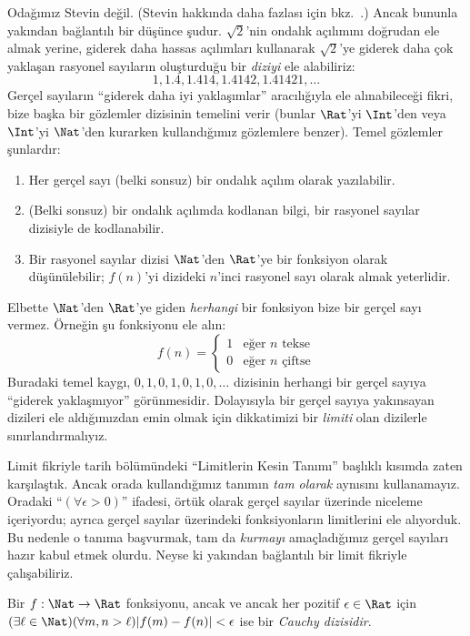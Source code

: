 Odağımız Stevin değil. (Stevin hakkında daha fazlası için
bkz.\ \citealt{KatzKatz2012}.) Ancak bununla yakından bağlantılı bir düşünce
şudur. $\sqrt{2}$'nin ondalık açılımını doğrudan ele almak yerine, giderek
daha hassas açılımları kullanarak $\sqrt{2}$'ye giderek daha çok yaklaşan
rasyonel sayıların oluşturduğu bir \emph{diziyi} ele alabiliriz:
\[
1, 1.4, 1.414, 1.4142, 1.41421,\ldots
\]
Gerçel sayıların “giderek daha iyi yaklaşımlar” aracılığıyla ele alınabileceği
fikri, bize başka bir gözlemler dizisinin temelini verir (bunlar $\Rat$'yi
$\Int$'den veya $\Int$'yi $\Nat$'den kurarken kullandığımız gözlemlere
benzer). Temel gözlemler şunlardır:
\begin{enumerate}
	\item Her gerçel sayı (belki sonsuz) bir ondalık açılım olarak yazılabilir.
	\item (Belki sonsuz) bir ondalık açılımda kodlanan bilgi, bir rasyonel
	sayılar dizisiyle de kodlanabilir.
	\item Bir rasyonel sayılar dizisi $\Nat$'den $\Rat$'ye bir fonksiyon olarak
	düşünülebilir; $f(n)$'yi dizideki $n$'inci rasyonel sayı olarak almak
	yeterlidir.
\end{enumerate}
Elbette $\Nat$'den $\Rat$'ye giden \emph{herhangi} bir fonksiyon bize bir gerçel
sayı vermez. Örneğin şu fonksiyonu ele alın:
\[
	f(n) =\begin{cases}
			1 & \text{eğer }n\text{ tekse}\\
			0 &\text{eğer }n\text{ çiftse}
		\end{cases}
\]
Buradaki temel kaygı, $0,1,0,1,0,1,0,\ldots$ dizisinin herhangi bir gerçel
sayıya “giderek yaklaşmıyor” görünmesidir. Dolayısıyla bir gerçel sayıya
yakınsayan dizileri ele aldığımızdan emin olmak için dikkatimizi bir
\emph{limiti} olan dizilerle sınırlandırmalıyız.

Limit fikriyle tarih bölümündeki “Limitlerin Kesin Tanımı” başlıklı kısımda
zaten karşılaştık. Ancak orada
kullandığımız tanımın \emph{tam olarak} aynısını kullanamayız. Oradaki
“$(\forall \epsilon>0)$” ifadesi, örtük olarak gerçel sayılar üzerinde
niceleme içeriyordu; ayrıca gerçel sayılar üzerindeki fonksiyonların limitlerini
ele alıyorduk. Bu nedenle o tanıma başvurmak, tam da \emph{kurmayı}
amaçladığımız gerçel sayıları hazır kabul etmek olurdu. Neyse ki yakından
bağlantılı bir limit fikriyle çalışabiliriz.
\begin{defn}
  Bir $f: \Nat \to \Rat$ fonksiyonu, ancak ve ancak her pozitif
  $\epsilon \in \Rat$ için
  $(\exists \ell \in \Nat)(\forall m, n > \ell)|f(m) - f(n)| < \epsilon$
  ise bir \emph{Cauchy dizisidir}.
\end{defn}

